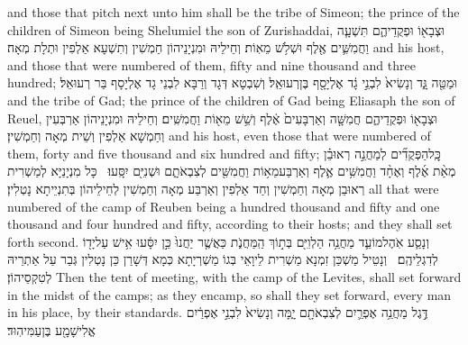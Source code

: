 {and those that pitch next unto him shall be the tribe of Simeon; the prince of the children of Simeon being Shelumiel the son of Zurishaddai,}{}
{וּצְבָא֖וֹ וּפְקֻדֵיהֶ֑ם תִּשְׁעָ֧ה וַחֲמִשִּׁ֛ים אֶ֖לֶף וּשְׁלֹ֥שׁ מֵאֽוֹת׃}
{וְחֵילֵיהּ וּמִנְיָנֵיהוֹן חַמְשִׁין וְתִשְׁעָא אַלְפִין וּתְלָת מְאָה׃}
{and his host, and those that were numbered of them, fifty and nine thousand and three hundred;}{}
{וּמַטֵּ֖ה גָּ֑ד וְנָשִׂיא֙ לִבְנֵ֣י גָ֔ד אֶלְיָסָ֖ף בֶּן\maqqaf רְעוּאֵֽל׃}
{וְשִׁבְטָא דְּגָד וְרַבָּא לִבְנֵי גָד אֶלְיָסָף בַּר רְעוּאֵל׃}
{and the tribe of Gad; the prince of the children of Gad being Eliasaph the son of Reuel,}{}
{וּצְבָא֖וֹ וּפְקֻדֵיהֶ֑ם חֲמִשָּׁ֤ה וְאַרְבָּעִים֙ אֶ֔לֶף וְשֵׁ֥שׁ מֵא֖וֹת וַחֲמִשִּֽׁים׃}
{וְחֵילֵיהּ וּמִנְיָנֵיהוֹן אַרְבְּעִין וְחַמְשָׁא אַלְפִין וְשֵׁית מְאָה וְחַמְשִׁין׃}
{and his host, even those that were numbered of them, forty and five thousand and six hundred and fifty;}{}
{כׇּֽל\maqqaf הַפְּקֻדִ֞ים לְמַחֲנֵ֣ה רְאוּבֵ֗ן מְאַ֨ת אֶ֜לֶף וְאֶחָ֨ד וַחֲמִשִּׁ֥ים אֶ֛לֶף וְאַרְבַּע\maqqaf מֵא֥וֹת וַחֲמִשִּׁ֖ים לְצִבְאֹתָ֑ם וּשְׁנִיִּ֖ם יִסָּֽעוּ׃ \setuma }
{כָּל מִנְיָנַיָּא לְמַשְׁרִית רְאוּבֵן מְאָה וְחַמְשִׁין וְחַד אַלְפִין וְאַרְבַּע מְאָה וְחַמְשִׁין לְחֵילֵיהוֹן בְּתִנְיֵיתָא נָטְלִין׃}
{all that were numbered of the camp of Reuben being a hundred thousand and fifty and one thousand and four hundred and fifty, according to their hosts; and they shall set forth second.}{}
{וְנָסַ֧ע אֹֽהֶל\maqqaf מוֹעֵ֛ד מַחֲנֵ֥ה הַלְוִיִּ֖ם בְּת֣וֹךְ הַֽמַּחֲנֹ֑ת כַּאֲשֶׁ֤ר יַחֲנוּ֙ כֵּ֣ן יִסָּ֔עוּ אִ֥ישׁ עַל\maqqaf יָד֖וֹ לְדִגְלֵיהֶֽם׃ \setuma }
{וְנָטֵיל מַשְׁכַּן זִמְנָא מַשְׁרִית לֵיוָאֵי בְּגוֹ מַשְׁרְיָתָא כְּמָא דְּשָׁרַן כֵּן נָטְלִין גְּבַר עַל אַתְרֵיהּ לְטִקְסֵיהוֹן׃}
{Then the tent of meeting, with the camp of the Levites, shall set forward in the midst of the camps; as they encamp, so shall they set forward, every man in his place, by their standards.}{}
{דֶּ֣גֶל מַחֲנֵ֥ה אֶפְרַ֛יִם לְצִבְאֹתָ֖ם יָ֑מָּה וְנָשִׂיא֙ לִבְנֵ֣י אֶפְרַ֔יִם אֱלִישָׁמָ֖ע בֶּן\maqqaf עַמִּיהֽוּד׃}
